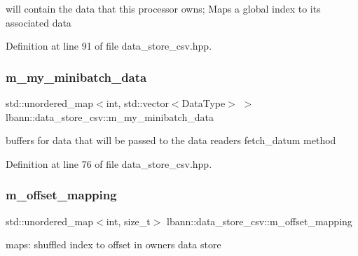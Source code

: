 will contain the data that this processor owns; Maps a global index to its associated data 

Definition at line 91 of file data\+\_\+store\+\_\+csv.\+hpp.

\mbox{\label{classlbann_1_1data__store__csv_a456bbbf6d09c1ec04cd6260cf11007d8}} 
\subsubsection{\texorpdfstring{m\+\_\+my\+\_\+minibatch\+\_\+data}{m\_my\_minibatch\_data}}
{\footnotesize\ttfamily std\+::unordered\+\_\+map$<$int, std\+::vector$<$Data\+Type$>$ $>$ lbann\+::data\+\_\+store\+\_\+csv\+::m\+\_\+my\+\_\+minibatch\+\_\+data\hspace{0.3cm}{\ttfamily [protected]}}



buffers for data that will be passed to the data reader\textquotesingle{}s fetch\+\_\+datum method 



Definition at line 76 of file data\+\_\+store\+\_\+csv.\+hpp.

\mbox{\label{classlbann_1_1data__store__csv_a4cb571710d2fd2a088bb55b7ac7ca29b}} 
\subsubsection{\texorpdfstring{m\+\_\+offset\+\_\+mapping}{m\_offset\_mapping}}
{\footnotesize\ttfamily std\+::unordered\+\_\+map$<$int, size\+\_\+t$>$ lbann\+::data\+\_\+store\+\_\+csv\+::m\+\_\+offset\+\_\+mapping\hspace{0.3cm}{\ttfamily [protected]}}



maps\+: shuffled index to offset in owner\textquotesingle{}s data store 



